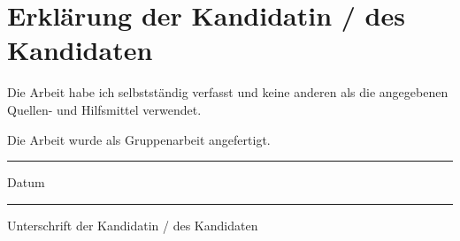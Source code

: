 \chapter{Erklärung der Kandidatin / des Kandidaten}

\begin{description}[$\Box$~]
\item[$\Box$] Die Arbeit habe ich selbstständig verfasst und keine anderen als die angegebenen Quellen- und Hilfsmittel verwendet.\\

\item[$\Box$] Die Arbeit wurde als Gruppenarbeit angefertigt.\\


\end{description}

\vspace{2cm}

\begin{minipage}[t]{3cm}
\rule{3cm}{0.5pt}
Datum
\end{minipage}
\hfill
\begin{minipage}[t]{9cm}
\rule{9cm}{0.5pt}
Unterschrift der Kandidatin / des Kandidaten
\end{minipage}